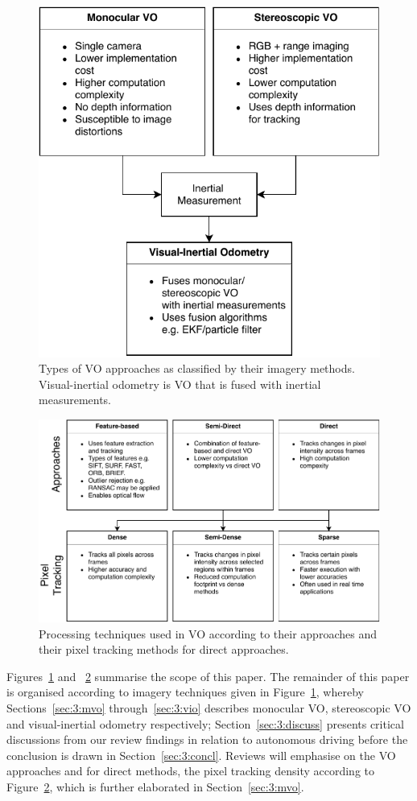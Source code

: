 \begin{figure}[ht]
	\centering
	\includegraphics[width=0.5\linewidth]{VO-Imagery.pdf}
	\caption[Types of VO approaches]{Types of VO approaches as classified by their imagery methods. Visual-inertial odometry is VO that is fused with inertial measurements.}
	\label{fig:3:imagery}
\end{figure}

\begin{figure}[ht]
	\centering
	\includegraphics[width=0.9\linewidth]{VO-Processing.pdf}
	\caption[VO processing techniques]{Processing techniques used in VO according to their approaches and their pixel tracking methods for direct approaches.}
	\label{fig:3:processing}
\end{figure}

Figures~\ref{fig:3:imagery} and ~\ref{fig:3:processing} summarise the scope of this paper. The remainder of this paper is organised according to imagery techniques given in  Figure~\ref{fig:3:imagery}, whereby Sections~\ref{sec:3:mvo} through~\ref{sec:3:vio} describes monocular VO, stereoscopic VO and visual-inertial odometry respectively; Section~\ref{sec:3:discuss} presents critical discussions from our review findings in relation to autonomous driving before the conclusion is drawn in Section~\ref{sec:3:concl}. Reviews will emphasise on the VO approaches and for direct methods, the pixel tracking density according to Figure~\ref{fig:3:processing}, which is further elaborated in Section~\ref{sec:3:mvo}.

